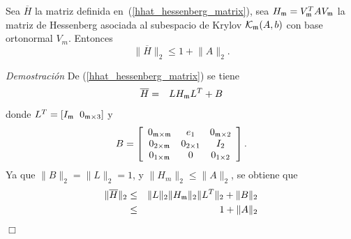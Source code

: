 \begin{lemma}\cite{naranjo2021locally}\label{H-bound}
	Sea $\overline{H}$ la matriz definida en~(\ref{hhat_hessenberg_matrix}), sea  $H_{\mathfrak{m}}=V^{T}_{\mathfrak{m}} AV_{\mathfrak{m}}$ la matriz de Hessenberg asociada al subespacio de Krylov $\mathcal{K}_{\mathfrak{m}}(A,b)$ con base ortonormal $V_m$. Entonces
	\[ \lVert\overline{H}\rVert_2 \leq 1 +  \lVert A\rVert_2. \]
\end{lemma}
\emph{Demostración}
De (\ref{hhat_hessenberg_matrix}) se tiene
\begin{eqnarray*}
	\overline{H}&=&L H_{\mathfrak{m}} L^T + B
\end{eqnarray*}
donde $ L^T=[I_{\mathfrak{m}} \;\; 0_{\mathfrak{m}\times 3}] $ y
\[B=\left[\begin{array}{ccc}
0_{\mathfrak{m}\times\mathfrak{m}} & e_1 & 0_{\mathfrak{m} \times 2}\\
0_{2\times\mathfrak{m}} & 0_{2 \times 1} & I_2\\
0_{1\times\mathfrak{m}} & 0 & 0_{1\times 2}
\end{array}\right].\]
Ya que $\lVert B\rVert_2 = \lVert L \rVert_2 = 1$, y $\lVert H_m\rVert_2 \le \lVert A \rVert_2$, se obtiene que
\begin{eqnarray*}
	\lVert\overline{H}\rVert_2 &\leq& \lVert L \rVert_2 \lVert H_{\mathfrak{m}} \rVert_2 \lVert L^T \rVert_2 + \lVert B \rVert_2\\
	&\leq& 1 + \lVert A\rVert_2
\end{eqnarray*}
$\Box$\\ \\


